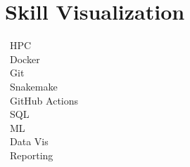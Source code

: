 \documentclass[a4paper,10pt]{article}
\begin{document}
\section*{Skill Visualization}
\begin{description}
  \item[\faServer\ HPC]          
  \item[\faDocker\ Docker]        
  \item[\faGithub\ Git]           
  \item[\faPuzzlePiece\ Snakemake]  
  \item[\faGithub\ GitHub Actions]  
  \item[\faDatabase\ SQL]         
  \item[\faBrain\ ML]             
  \item[\faChartBar\ Data Vis]    
  \item[\faBook\ Reporting]        
\end{description}

\LastUpdate
\end{document}
